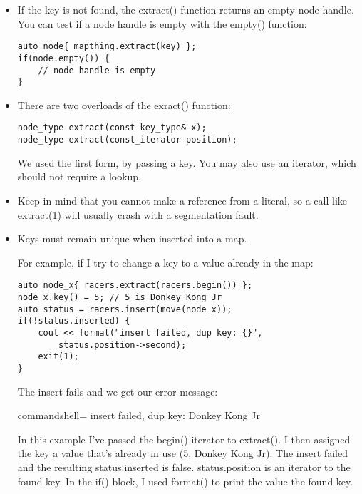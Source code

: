 \begin{itemize}
\item 
If the key is not found, the extract() function returns an empty node handle.
You can test if a node handle is empty with the empty() function:

\begin{lstlisting}[style=styleCXX]
auto node{ mapthing.extract(key) };
if(node.empty()) {
	// node handle is empty
}
\end{lstlisting}

\item 
There are two overloads of the exract() function:

\begin{lstlisting}[style=styleCXX]
node_type extract(const key_type& x);
node_type extract(const_iterator position);
\end{lstlisting}

We used the first form, by passing a key. You may also use an iterator, which should not require a lookup.

\item 
Keep in mind that you cannot make a reference from a literal, so a call like extract(1) will usually crash with a segmentation fault.

\item 
Keys must remain unique when inserted into a map.

For example, if I try to change a key to a value already in the map:

\begin{lstlisting}[style=styleCXX]
auto node_x{ racers.extract(racers.begin()) };
node_x.key() = 5; // 5 is Donkey Kong Jr
auto status = racers.insert(move(node_x));
if(!status.inserted) {
	cout << format("insert failed, dup key: {}",
		status.position->second);
	exit(1);
}
\end{lstlisting}

The insert fails and we get our error message:

\begin{tcblisting}{commandshell={}}
insert failed, dup key: Donkey Kong Jr
\end{tcblisting}

In this example I've passed the begin() iterator to extract(). I then assigned the key a value that's already in use (5, Donkey Kong Jr). The insert failed and the resulting status.inserted is false. status.position is an iterator to the found key. In the if() block, I used format() to print the value the found key.
\end{itemize}







